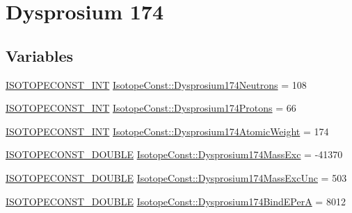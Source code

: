 \hypertarget{group___isotope_const-_dysprosium-_dy174}{}\section{Dysprosium 174}
\label{group___isotope_const-_dysprosium-_dy174}
\subsection*{Variables}
\begin{DoxyCompactItemize}
\item 
\mbox{\hyperlink{group___isotope_const-_macros_ga5f18360b3e99483a35c32d789e62621c}{I\+S\+O\+T\+O\+P\+E\+C\+O\+N\+S\+T\+\_\+\+I\+NT}} \mbox{\hyperlink{group___isotope_const-_dysprosium-_dy174_ga12a9a590de21d37cf4b26fb9b938f814}{Isotope\+Const\+::\+Dysprosium174\+Neutrons}} = 108
\item 
\mbox{\hyperlink{group___isotope_const-_macros_ga5f18360b3e99483a35c32d789e62621c}{I\+S\+O\+T\+O\+P\+E\+C\+O\+N\+S\+T\+\_\+\+I\+NT}} \mbox{\hyperlink{group___isotope_const-_dysprosium-_dy174_ga8ca5274d6fdfa70945053a25ed12f891}{Isotope\+Const\+::\+Dysprosium174\+Protons}} = 66
\item 
\mbox{\hyperlink{group___isotope_const-_macros_ga5f18360b3e99483a35c32d789e62621c}{I\+S\+O\+T\+O\+P\+E\+C\+O\+N\+S\+T\+\_\+\+I\+NT}} \mbox{\hyperlink{group___isotope_const-_dysprosium-_dy174_ga32b794cb421ecbf3dff96460c66edafc}{Isotope\+Const\+::\+Dysprosium174\+Atomic\+Weight}} = 174
\item 
\mbox{\hyperlink{group___isotope_const-_macros_ga8f45a7272ce02c0b4c65c44636ed719a}{I\+S\+O\+T\+O\+P\+E\+C\+O\+N\+S\+T\+\_\+\+D\+O\+U\+B\+LE}} \mbox{\hyperlink{group___isotope_const-_dysprosium-_dy174_ga49018e8ebef106dfbc7fca0ec4bef9c2}{Isotope\+Const\+::\+Dysprosium174\+Mass\+Exc}} = -\/41370
\item 
\mbox{\hyperlink{group___isotope_const-_macros_ga8f45a7272ce02c0b4c65c44636ed719a}{I\+S\+O\+T\+O\+P\+E\+C\+O\+N\+S\+T\+\_\+\+D\+O\+U\+B\+LE}} \mbox{\hyperlink{group___isotope_const-_dysprosium-_dy174_ga89cddf0f4cfb88bba2164a9169edb89b}{Isotope\+Const\+::\+Dysprosium174\+Mass\+Exc\+Unc}} = 503
\item 
\mbox{\hyperlink{group___isotope_const-_macros_ga8f45a7272ce02c0b4c65c44636ed719a}{I\+S\+O\+T\+O\+P\+E\+C\+O\+N\+S\+T\+\_\+\+D\+O\+U\+B\+LE}} \mbox{\hyperlink{group___isotope_const-_dysprosium-_dy174_ga23a1f0bc32ce4c714b6886def56c39c2}{Isotope\+Const\+::\+Dysprosium174\+Bind\+E\+PerA}} = 8012
\item 

\end{DoxyCompactItemize}
